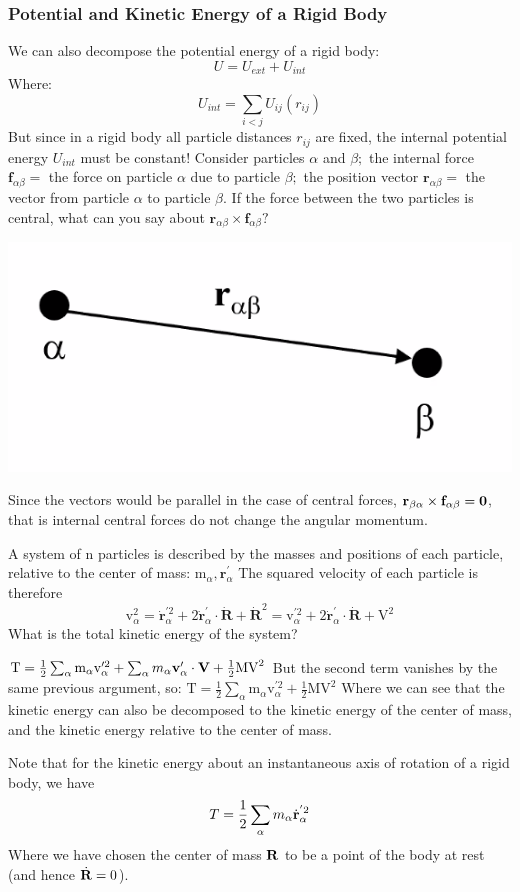 \subsubsection{Potential and Kinetic Energy of a Rigid Body}
We can also decompose the potential energy of a rigid body:
\[U = U_{ext} + U_{int}\]
Where:
\[U_{int} = \sum_{i < j} U_{ij}(r_{ij})\]
But since in a rigid body all particle distances $r_{ij}$ are fixed, the internal potential energy $U_{int}$ must be constant!
\newline Consider particles $\alpha$ and $\beta ;$ the internal force $\mathbf{f}_{\alpha \beta}=$ the force on particle $\alpha$ due to particle $\beta ;$ the position vector $\mathbf{r}_{\alpha \beta}=$ the vector from particle $\alpha$ to particle $\beta .$ If the force between the two particles is central, what can you say about $\mathbf{r}_{\alpha \beta} \times \mathbf{f}_{\alpha \beta} ?$
\begin{center}
    \includegraphics[scale=0.5]{Lecture-17/l17-img3.png}
\end{center}
\begin{s}
Since the vectors would be parallel in the case of central forces, $\mathbf{r}_{\beta\alpha} \times \mathbf{f}_{\alpha\beta} = \mathbf{0}$, that is internal central forces do not change the angular momentum.
\end{s}
A system of n particles is described by the masses and positions of each particle, relative to the center of mass: $\mathrm{m}_{\alpha}, \mathbf{r}_{\alpha}^{\prime}$ The squared velocity of each particle is therefore
$$
\mathrm{v}_{\alpha}^{2}=\dot{\mathbf{r}}_{\alpha}^{\prime 2}+2 \dot{\mathbf{r}}_{\alpha}^{\prime} \cdot \dot{\mathbf{R}}+\dot{\mathbf{R}}^{2}=\mathrm{v}_{\alpha}^{\prime 2}+2 \dot{\mathbf{r}}_{\alpha}^{\prime} \cdot \dot{\mathbf{R}}+\mathrm{V}^{2}
$$
What is the total kinetic energy of the system?
\begin{s}
$\mathrm{T}=\frac{1}{2} \sum_{\alpha} \mathrm{m}_{\alpha} \mathrm{v}_{\alpha}^{\prime 2}+ \sum_\alpha m_\alpha \mathbf{v}_\alpha' \cdot \mathbf{V} + \frac{1}{2} \mathrm{MV}^{2} $ But the second term vanishes by the same previous argument, so:
$\mathrm{T}=\frac{1}{2} \sum_{\alpha} \mathrm{m}_{\alpha} \mathrm{v}_{\alpha}^{\prime 2}+\frac{1}{2} \mathrm{MV}^{2}$ Where we can see that the kinetic energy can also be decomposed to the kinetic energy of the center of mass, and the kinetic energy relative to the center of mass. 
\end{s}
Note that for the kinetic energy about an instantaneous axis of rotation of a rigid body, we have
\[T = \frac{1}{2}\sum_\alpha m_\alpha \dot{\mathbf{r}}^{'2}_\alpha\]
Where we have chosen the center of mass $\mathbf{R}$ to be a point of the body at rest (and hence $\dot{\mathbf{R}} = 0$). 
